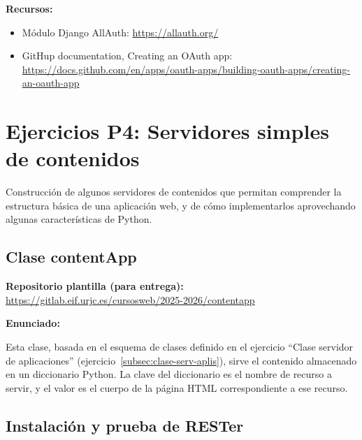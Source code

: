 \textbf{Recursos:}

\begin{itemize}
\item Módulo Django AllAuth: \url{https://allauth.org/}
\item GitHup documentation, Creating an OAuth app: \\
  \url{https://docs.github.com/en/apps/oauth-apps/building-oauth-apps/creating-an-oauth-app}
\end{itemize}

\section{Ejercicios P4: Servidores simples de contenidos}

Construcción de algunos servidores de contenidos que permitan comprender la estructura básica de una aplicación web, y de cómo implementarlos aprovechando algunas características de Python.

\subsection{Clase contentApp}
\label{subsec:contentapp}

\textbf{Repositorio plantilla (para entrega):} \\
\url{https://gitlab.eif.urjc.es/cursosweb/2025-2026/contentapp}

\textbf{Enunciado:}

Esta clase, basada en el esquema de clases definido en el ejercicio ``Clase servidor de aplicaciones'' (ejercicio~\ref{subsec:clase-serv-aplis}), sirve el contenido almacenado en un diccionario Python. La clave del diccionario es el nombre de recurso a servir, y el valor es el cuerpo de la página HTML correspondiente a ese recurso.

\subsection{Instalación y prueba de RESTer}
\label{subsec:inst-rester}


